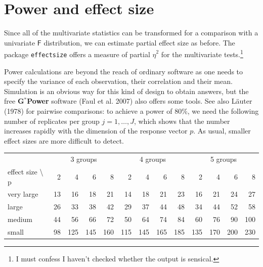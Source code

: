 \documentclass[
  11pt,
  letterpaper,
]{scrbook}
\theoremstyle{definition}
\theoremstyle{definition}
\theoremstyle{remark}
\begin{document}
\section{Power and effect size}\label{power-and-effect-size}

Since all of the multivariate statistics can be transformed for a
comparison with a univariate \(\mathsf{F}\) distribution, we can
estimate partial effect size as before. The package \texttt{effectsize}
offers a measure of partial \(\widehat{\eta}^2\) for the multivariate
tests.\footnote{I must confess I haven't checked whether the output is
  sensical.}

Power calculations are beyond the reach of ordinary software as one
needs to specify the variance of each observation, their correlation and
their mean. Simulation is an obvious way for this kind of design to
obtain answers, but the free \textbf{G}\({}^{*}\)\textbf{Power} software
(Faul et al. 2007) also offers some tools. See also Läuter (1978) for
pairwise comparisons: to achieve a power of 80\%, we need the following
number of replicates per group \(j=1, \ldots, J\), which shows that the
number increases rapidly with the dimension of the response vector
\(p\). As usual, smaller effect sizes are more difficult to detect.

\begin{table}
\centering
\begin{tabular}[t]{l|r|r|r|r|r|r|r|r|r|r|r|r}
\hline
\multicolumn{1}{c|}{ } & \multicolumn{4}{c|}{3 groups} & \multicolumn{4}{c|}{4 groups} & \multicolumn{4}{c}{5 groups} \\
\cline{2-5} \cline{6-9} \cline{10-13}
effect size \textbackslash{} p & 2 & 4 & 6 & 8 & 2 & 4 & 6 & 8 & 2 & 4 & 6 & 8\\
\hline
very large & 13 & 16 & 18 & 21 & 14 & 18 & 21 & 23 & 16 & 21 & 24 & 27\\
\hline
large & 26 & 33 & 38 & 42 & 29 & 37 & 44 & 48 & 34 & 44 & 52 & 58\\
\hline
medium & 44 & 56 & 66 & 72 & 50 & 64 & 74 & 84 & 60 & 76 & 90 & 100\\
\hline
small & 98 & 125 & 145 & 160 & 115 & 145 & 165 & 185 & 135 & 170 & 200 & 230\\
\hline
\end{tabular}
\end{table}
\end{document}
